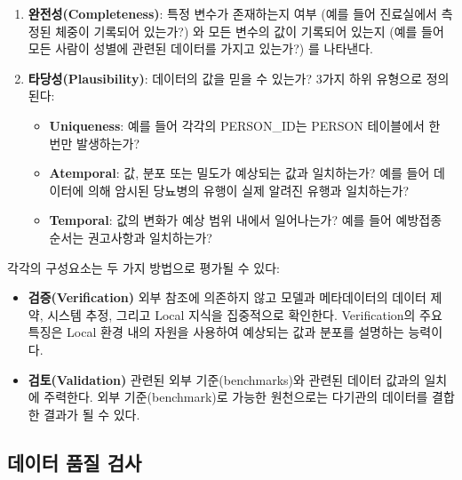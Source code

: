 \documentclass[11pt]{book}
\providecommand{\tightlist}{%
  \setlength{\itemsep}{0pt}\setlength{\parskip}{0pt}}
\theoremstyle{definition}
\theoremstyle{definition}
\theoremstyle{definition}
\theoremstyle{remark}
\begin{document}
\begin{enumerate}
\def\labelenumi{\arabic{enumi}.}
\setcounter{enumi}{1}
\tightlist
\item
  \textbf{완전성(Completeness)}: 특정 변수가 존재하는지 여부 (예를 들어
  진료실에서 측정된 체중이 기록되어 있는가?) 와 모든 변수의 값이
  기록되어 있는지 (예를 들어 모든 사람이 성별에 관련된 데이터를 가지고
  있는가?) 를 나타낸다.
\item
  \textbf{타당성(Plausibility)}: 데이터의 값을 믿을 수 있는가? 3가지
  하위 유형으로 정의된다:

  \begin{itemize}
  \tightlist
  \item
    \textbf{Uniqueness}: 예를 들어 각각의 PERSON\_ID는 PERSON 테이블에서
    한 번만 발생하는가?
  \item
    \textbf{Atemporal}: 값, 분포 또는 밀도가 예상되는 값과 일치하는가?
    예를 들어 데이터에 의해 암시된 당뇨병의 유행이 실제 알려진 유행과
    일치하는가?
  \item
    \textbf{Temporal}: 값의 변화가 예상 범위 내에서 일어나는가? 예를
    들어 예방접종 순서는 권고사항과 일치하는가?
  \end{itemize}

   
\end{enumerate}

각각의 구성요소는 두 가지 방법으로 평가될 수 있다:

\begin{itemize}
\tightlist
\item
  \textbf{검증(Verification)} 외부 참조에 의존하지 않고 모델과
  메타데이터의 데이터 제약, 시스템 추정, 그리고 Local 지식을 집중적으로
  확인한다. Verification의 주요 특징은 Local 환경 내의 자원을 사용하여
  예상되는 값과 분포를 설명하는 능력이다.
\item
  \textbf{검토(Validation)} 관련된 외부 기준(benchmarks)와 관련된 데이터
  값과의 일치에 주력한다. 외부 기준(benchmark)로 가능한 원천으로는
  다기관의 데이터를 결합한 결과가 될 수 있다.
\end{itemize}

 

\subsection{데이터 품질 검사}\label{--}

 
\end{document}
